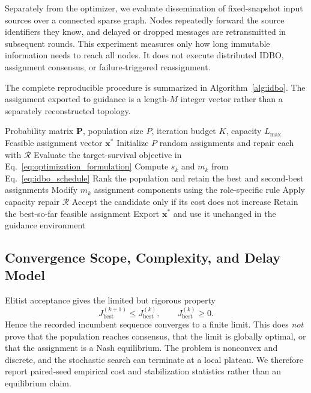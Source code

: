\documentclass[lettersize,journal]{IEEEtran}
\begin{document}
{Separately from the optimizer, we evaluate dissemination of fixed-snapshot input
sources over a connected sparse graph. Nodes repeatedly forward the source
identifiers they know, and delayed or dropped messages are retransmitted in
subsequent rounds. This experiment measures only how long immutable information
needs to reach all nodes. It does not execute distributed IDBO, assignment
consensus, or failure-triggered reassignment.

The complete reproducible procedure is summarized in
Algorithm~\ref{alg:idbo}. The assignment exported to guidance is a length-\(M\)
integer vector rather than a separately reconstructed topology.

\begin{algorithm}[!t]
\caption{Capacity-Constrained IDBO and Assignment Export}
\label{alg:idbo}
\footnotesize
\begin{algorithmic}[1]
\REQUIRE Probability matrix \(\mathbf{P}\), population size \(P\), iteration
budget \(K\), capacity \(L_{\max}\)
\ENSURE Feasible assignment vector \(\mathbf{x}^{*}\)
\STATE Initialize \(P\) random assignments and repair each with \(\mathcal{R}\)
\STATE Evaluate the target-survival objective in
Eq.~\eqref{eq:optimization_formulation}
    \STATE Compute \(s_k\) and \(m_k\) from Eq.~\eqref{eq:idbo_schedule}
    \STATE Rank the population and retain the best and second-best assignments
        \STATE Modify \(m_k\) assignment components using the role-specific rule
        \STATE Apply capacity repair \(\mathcal{R}\)
        \STATE Accept the candidate only if its cost does not increase
    \ENDFOR
    \STATE Retain the best-so-far feasible assignment
\ENDFOR
\STATE Export \(\mathbf{x}^{*}\) and use it unchanged in the guidance environment
\end{algorithmic}
\end{algorithm}

\subsection{Convergence Scope, Complexity, and Delay Model}
\label{subsec:convergence_equilibrium}

Elitist acceptance gives the limited but rigorous property
\begin{equation}
\label{eq:incumbent_monotone}
J_{\mathrm{best}}^{(k+1)}\le J_{\mathrm{best}}^{(k)},\qquad
J_{\mathrm{best}}^{(k)}\ge 0 .
\end{equation}
Hence the recorded incumbent sequence converges to a finite limit. This does
\emph{not} prove that the population reaches consensus, that the limit is
globally optimal, or that the assignment is a Nash equilibrium. The problem is
nonconvex and discrete, and the stochastic search can terminate at a local
plateau. We therefore report paired-seed empirical cost and stabilization
statistics rather than an equilibrium claim.

}
\end{document}
